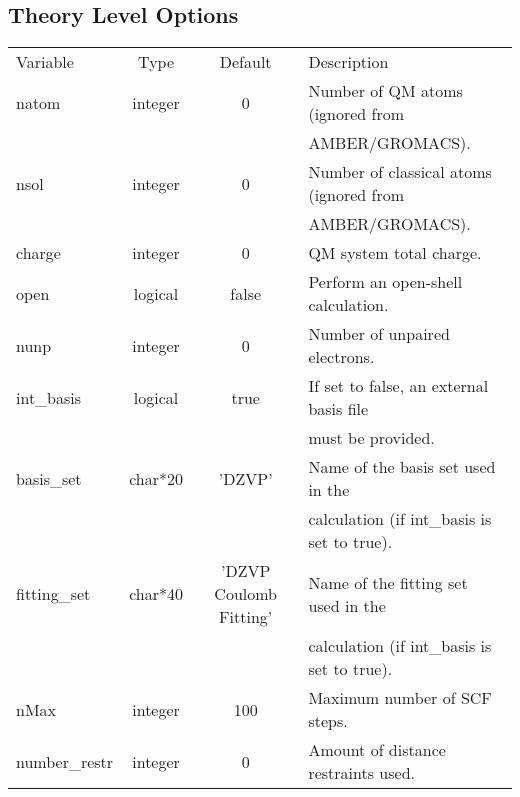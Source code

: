 \documentclass[journal=jctcce,manuscript=article]{achemso}
\begin{document}
    \subsection{Theory Level Options}
    \begin{table}  [H]
      \begin{center}
      \begin{tabular}{ l c c l}
         Variable & Type & Default & Description \\
         natom & integer & 0 & Number of QM atoms (ignored from \\
            & & & AMBER/GROMACS). \\
         nsol & integer & 0 & Number of classical atoms (ignored from \\
            & & & AMBER/GROMACS). \\
         charge & integer & 0 & QM system total charge. \\
         open & logical & false & Perform an open-shell calculation. \\
         nunp & integer & 0 & Number of unpaired electrons. \\
         int\_basis & logical & true & If set to false, an external basis file \\ 
            & & & must be provided. \\
         basis\_set & char*20 & 'DZVP' & Name of the basis set used in the \\
            & & & calculation (if int\_basis is set to true). \\
         fitting\_set & char*40 & 'DZVP Coulomb Fitting' & Name of the fitting set used in the \\
            & & & calculation (if int\_basis is set to true). \\
         nMax & integer & 100 & Maximum number of SCF steps. \\
         number\_restr & integer & 0 & Amount of distance restraints used. \\
      \end{tabular}
       \end{center}
      \label{lio.theory.var}
    \end{table}  
    
\end{document}
